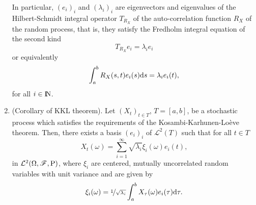 \documentclass[a4paper,10pt]{article}
\begin{document}
\begin{enumerate}
       In particular, \((e_i)_i\) and \((\lambda_i)_i\) are eigenvectors and eigenvalues of the 
       Hilbert-Schmidt integral operator \(T_{R_X}\) of the auto-correlation function \(R_X\) of the 
       random process, that is, they satisfy the Fredholm integral equation of the second kind
       \[
        T_{R_X}e_i = \lambda_i e_i
       \]
       or equivalently
       \[
        \int_{a}^{b} R_X(s,t) e_i(s) \mathrm{d} s = \lambda_i e_i(t),
       \]
       for all $i\in\N$.
 \item (Corollary of KKL theorem). Let \((X_t)_{t\in T}\), \(T=[a,b]\), be a stochastic process 
       which satisfies the requirements of the Kosambi-Karhunen-Lo{\`e}ve theorem. Then, there 
       exists a basis \((e_i)_i\) of \(\mathcal{L}^2(T)\) such that for all \(t\in T\)
       \[
        X_t(\omega) = \sum_{i=1}^{\infty} \sqrt{\lambda_i}\xi_i(\omega)e_i(t),
       \]
       in \(\mathcal{L}^2(\Omega,\mathscr{F},\mathrm{P})\), where \(\xi_i\) are centered, mutually uncorrelated random
       variables with unit variance and are given by
       \[
        \xi_i(\omega) = \nicefrac{1}{\sqrt{\lambda_i}}\int_{a}^{b} X_{\tau}(\omega) e_i(\tau) \mathrm{d} \tau.
       \]
\end{enumerate}
\end{document}
